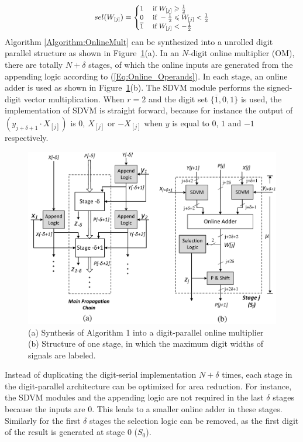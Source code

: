 \documentclass{acm_proc_article-sp}
\begin{document}
\vspace{-2ex}
\begin{eqnarray}\label{Eq:SelFunc_OM}
\small
  sel(W_{[j]})=\begin{cases}
    1 & \text{ if } W_{[j]} \geqslant \frac{1}{2} \\
    0 & \text{ if } -\frac{1}{2}\leqslant W_{[j]}<\frac{1}{2} \\
    \overline{1} & \text{ if } W_{[j]}<-\frac{1}{2}
  \end{cases}
\normalsize
\end{eqnarray}
%
Algorithm \ref{Algorithm:OnlineMult} can be synthesized into a unrolled digit parallel structure as shown in  Figure~\ref{Fig:Radix2OnlineMultiplier}(a). In an $N$-digit online multiplier (OM), there are totally $N+\delta$ stages, of which the online inputs are generated from the appending logic according to (\ref{Eq:Online_Operands}). In each stage, an online adder is used as shown in Figure~\ref{Fig:Radix2OnlineMultiplier}(b). The SDVM module performs the signed-digit vector multiplication. When $r=2$ and the digit set $\{\overline{1},0,1\}$ is used, the implementation of SDVM is straight forward, because for instance the output of $(y_{j+\delta+1}\cdot X_{[j]})$ is 0, $X_{[j]}$ or $-X_{[j]}$ when $y$ is equal to $0$, $1$ and $-1$ respectively.\vspace{-1ex}

\begin{figure}[tbp]
\centering
\includegraphics[width=.49\textwidth]{./Figures/OnlineMult_Unrolled.pdf}
\vspace{-4ex}
\caption{(a) Synthesis of Algorithm 1 into a digit-parallel online multiplier (b) Structure of one stage, in which the maximum digit widths of signals are labeled.}
\vspace{-2ex}
\label{Fig:Radix2OnlineMultiplier}
\end{figure}

Instead of duplicating the digit-serial implementation $N+\delta$ times, each stage in the digit-parallel architecture can be optimized for area reduction. For instance, the SDVM modules and the appending logic are not required in the last $\delta$ stages because the inputs are 0. This leads to a smaller online adder in these stages. Similarly for the first $\delta$ stages the selection logic can be removed, as the first digit of the result is generated at stage 0 ($S_0$).
\end{document}
